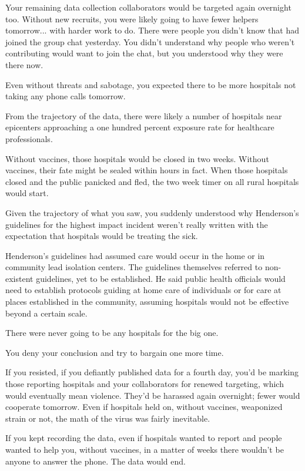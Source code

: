 \documentclass[a5paper, symmetric]{tufte-book}
\begin{document}
Your remaining data collection collaborators would be targeted again overnight too. Without new recruits, you were likely going to have fewer helpers tomorrow... with harder work to do. There were people you didn't know that had joined the group chat yesterday. You didn't understand why people who weren't contributing would want to join the chat, but you understood why they were there now. 

Even without threats and sabotage, you expected there to be more hospitals not taking any phone calls tomorrow. 

From the trajectory of the data, there were likely a number of hospitals near epicenters approaching a one hundred percent exposure rate for healthcare professionals. 

Without vaccines, those hospitals would be closed in two weeks. Without vaccines, their fate might be sealed within hours in fact. When those hospitals closed and the public panicked and fled, the two week timer on all rural hospitals would start. 

Given the trajectory of what you saw, you suddenly understood why Henderson's guidelines for the highest impact incident weren't really written with the expectation that hospitals would be treating the sick. 

Henderson's guidelines had assumed care would occur in the home or in community lead isolation centers. The guidelines themselves referred to non-existent guidelines, yet to be established. He said public health officials would need to establish protocols guiding at home care of individuals or for care at places established in the community, assuming hospitals would not be effective beyond a certain scale. 

There were never going to be any hospitals for the big one.

You deny your conclusion and try to bargain one more time. 

If you resisted, if you defiantly published data for a fourth day, you'd be marking those reporting hospitals and your collaborators for renewed targeting, which would eventually mean violence. They'd be harassed again overnight; fewer would cooperate tomorrow. Even if hospitals held on, without vaccines, weaponized strain or not, the math of the virus was fairly inevitable. 

If you kept recording the data, even if hospitals wanted to report and people wanted to help you, without vaccines, in a matter of weeks there wouldn't be anyone to answer the phone. The data would end.
\end{document}
